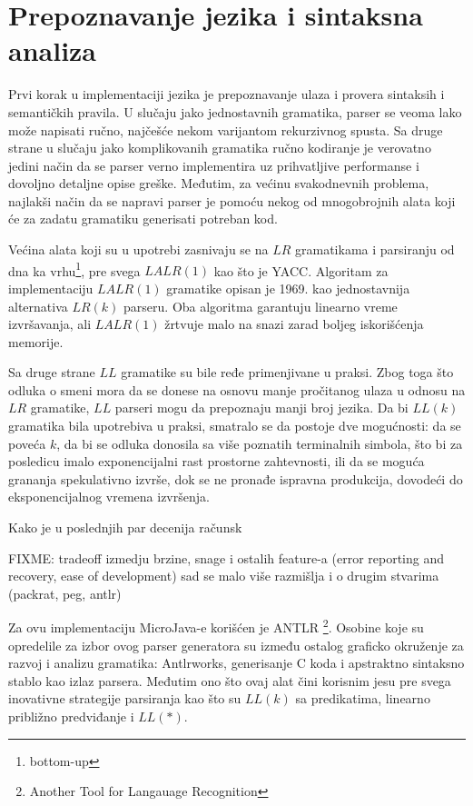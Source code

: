 \chapter{Prepoznavanje jezika i sintaksna analiza}

Prvi korak u implementaciji jezika je prepoznavanje ulaza i provera sintaksih i semantičkih pravila. 
U slučaju jako jednostavnih gramatika, parser se veoma lako može napisati ručno, najčešće nekom varijantom rekurzivnog spusta. 
Sa druge strane u slučaju jako komplikovanih gramatika ručno kodiranje je verovatno jedini način da se parser verno implementira uz prihvatljive performanse i dovoljno detaljne opise greške.
Međutim, za većinu svakodnevnih problema, najlakši način da se napravi parser je pomoću nekog od mnogobrojnih alata koji će za zadatu gramatiku generisati potreban kod. 

Većina alata koji su u upotrebi zasnivaju se na $LR$\cite{lr} gramatikama i parsiranju od dna ka vrhu\footnote{\eng bottom-up}, pre svega $LALR(1)$ kao što je YACC\cite{yacc}.
Algoritam za implementaciju $LALR(1)$ gramatike opisan je 1969. kao jednostavnija alternativa $LR(k)$ parseru.
Oba algoritma garantuju linearno vreme izvršavanja, ali $LALR(1)$ žrtvuje malo na snazi zarad boljeg iskorišćenja memorije.

Sa druge strane $LL$ gramatike su bile ređe primenjivane u praksi.
Zbog toga što odluka o smeni mora da se donese na osnovu manje pročitanog ulaza u odnosu na $LR$ gramatike, $LL$ parseri mogu da prepoznaju manji broj jezika.
Da bi $LL(k)$ gramatika bila upotrebiva u praksi, smatralo se da postoje dve mogućnosti: da se poveća $k$, da bi se odluka donosila sa više poznatih terminalnih simbola, što bi za posledicu imalo exponencijalni rast prostorne zahtevnosti, ili da se moguća grananja spekulativno izvrše, dok se ne pronađe ispravna produkcija, dovodeći do eksponencijalnog vremena izvršenja.

Kako je u poslednjih par decenija računsk

FIXME:
tradeoff izmedju brzine, snage i ostalih feature-a (error reporting and recovery, ease of development)
sad se malo više razmišlja i o drugim stvarima (packrat, peg, antlr)

Za ovu implementaciju MicroJava-e korišćen je ANTLR
\footnote{\skr \eng Another Tool for Langauage Recognition}.
Osobine koje su opredelile za izbor ovog parser generatora su između ostalog graficko okruženje za razvoj i analizu gramatika: Antlrworks, generisanje C koda i apstraktno sintaksno stablo kao izlaz parsera.
Međutim ono što ovaj alat čini korisnim jesu pre svega inovativne strategije parsiranja kao što su $LL(k)$ sa predikatima\cite{pred-llk}, linearno približno predviđanje\cite{parr-thesis} i $LL(*)$\cite{ll*}.

